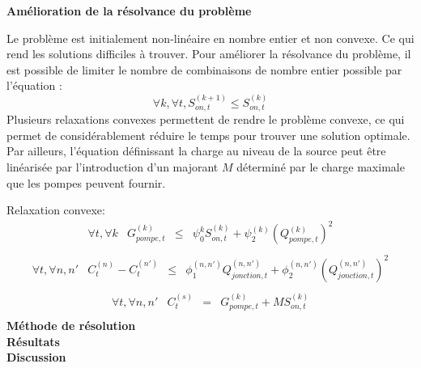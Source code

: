 \documentclass{article}
\begin{document}
\textbf{Amélioration de la résolvance du problème}
\begin{multicols}{2}
    Le problème est initialement non-linéaire en nombre entier et non convexe. Ce qui rend les solutions difficiles à trouver. Pour améliorer la résolvance du problème, il est possible de limiter le nombre de combinaisons de nombre entier possible par l'équation :
    \begin{equation}
        \tag{Symétrie}
        \forall k, \forall t, S_{on,t}^{(k+1)}\leq S_{on,t}^{(k)}
    \end{equation}
    Plusieurs relaxations convexes permettent de rendre le problème convexe, ce qui permet de considérablement réduire le temps pour trouver une solution optimale.\\
    Par ailleurs, l'équation définissant la charge au niveau de la source peut être linéarisée par l'introduction d'un majorant $M$ déterminé par le charge maximale que les pompes peuvent fournir.
\end{multicols}
Relaxation convexe:
\begin{equation}
    \tag{Gain charge pompe relax.}
    \left.
        \begin{array}{lccc}
            \forall t, \forall k   &   G_{pompe,t}^{(k)}     & \leq &   \psi_0^{k}S_{on,t}^{(k)} + \psi_2^{(k)}(Q_{pompe,t}^{(k)})^2\\[0.2cm]
        \end{array}
    \right.
\end{equation}
\begin{equation}
    \tag{Perte charge flux relax.}
    \left.
        \begin{array}{lcccc}
            \forall t, \forall n,n'   &   C_t^{(n)}  - C_t^{(n')}    & \leq &   \phi_1^{(n,n')}Q_{jonction,t}^{(n,n')} + \phi_2^{(n,n')}(Q_{jonction,t}^{(n,n')})^2\\[0.2cm]
        \end{array}
    \right.
\end{equation}
\begin{equation}
    \tag{Charge source relax.}
    \left.
        \begin{array}{lcccc}
            \forall t, \forall n,n'   &   C_t^{(s)} & = & G_{pompe,t}^{(k)} + M S_{on,t}^{(k)}\\[0.2cm]
        \end{array}
    \right.
\end{equation}
\textbf{Méthode de résolution}\\
\textbf{Résultats}\\
\textbf{Discussion}\\
\end{document}
